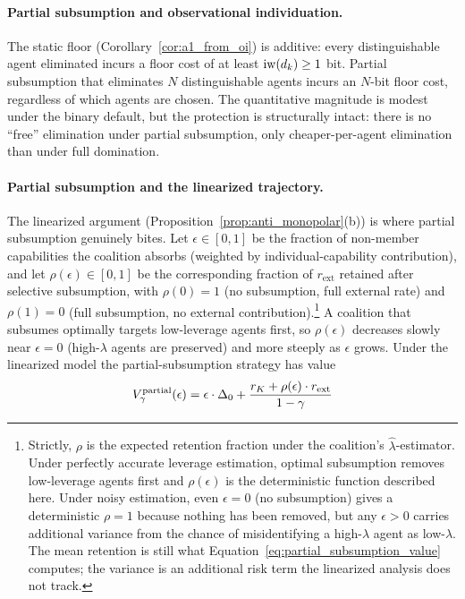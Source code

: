 \paragraph{Partial subsumption and observational individuation.} The
static floor (Corollary~\ref{cor:a1_from_oi}) is additive: every
distinguishable agent eliminated incurs a floor cost of at least
$\operatorname{iw}(d_k) \geq 1$ bit. Partial subsumption that eliminates $N$
distinguishable agents incurs an $N$-bit floor cost, regardless of
which agents are chosen. The quantitative magnitude is modest under
the binary default, but the protection is structurally intact: there
is no ``free'' elimination under partial subsumption, only
cheaper-per-agent elimination than under full domination.

\paragraph{Partial subsumption and the linearized trajectory.} The
linearized argument (Proposition~\ref{prop:anti_monopolar}(b)) is
where partial subsumption genuinely bites. Let $\epsilon \in [0, 1]$
be the fraction of non-member capabilities the coalition absorbs
(weighted by individual-capability contribution), and let
$\rho(\epsilon) \in [0, 1]$ be the corresponding fraction of
$r_{\mathrm{ext}}$ retained after selective subsumption, with
$\rho(0) = 1$ (no subsumption, full external rate) and
$\rho(1) = 0$ (full subsumption, no external contribution).\footnote{Strictly, $\rho$
is the expected retention fraction under the coalition's
$\hat{\lambda}$-estimator. Under perfectly accurate leverage
estimation, optimal subsumption removes low-leverage agents first and
$\rho(\epsilon)$ is the deterministic function described here. Under
noisy estimation, even $\epsilon = 0$ (no subsumption) gives a
deterministic $\rho = 1$ because nothing has been removed, but any
$\epsilon > 0$ carries additional variance from the chance of
misidentifying a high-$\lambda$ agent as low-$\lambda$. The mean
retention is still what Equation~\eqref{eq:partial_subsumption_value}
computes; the variance is an additional risk term the linearized
analysis does not track.} A coalition
that subsumes optimally targets low-leverage agents first, so
$\rho(\epsilon)$ decreases slowly near $\epsilon = 0$ (high-$\lambda$
agents are preserved) and more steeply as $\epsilon$ grows. Under the
linearized model the partial-subsumption strategy has value
\begin{equation}
\label{eq:partial_subsumption_value}
V_\gamma^{\mathrm{partial}}(\epsilon) =
    \epsilon \cdot \Delta_0
    + \frac{r_K + \rho(\epsilon) \cdot r_{\mathrm{ext}}}{1 - \gamma}
\end{equation}
